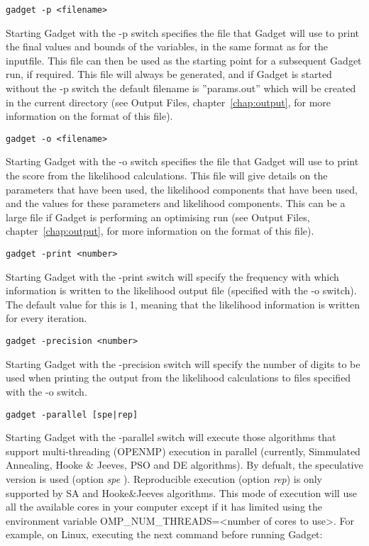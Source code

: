 \documentclass[10pt,twoside]{book}
\begin{document}
\newpage %
{\small\begin{verbatim}
gadget -p <filename>
\end{verbatim}}
Starting Gadget with the -p switch specifies the file that Gadget will use to print the final values and bounds of the variables, in the same format as for the inputfile.  This file can then be used as the starting point for a subsequent Gadget run, if required.  This file will always be generated, and if Gadget is started without the -p switch the default filename is ''params.out'' which will be created in the current directory (see Output Files, chapter~\ref{chap:output}, for more information on the format of this file).

{\small\begin{verbatim}
gadget -o <filename>
\end{verbatim}}
Starting Gadget with the -o switch specifies the file that Gadget will use to print the score from the likelihood calculations.  This file will give details on the parameters that have been used, the likelihood components that have been used, and the values for these parameters and likelihood components.  This can be a large file if Gadget is performing an optimising run (see Output Files, chapter~\ref{chap:output}, for more information on the format of this file).

{\small\begin{verbatim}
gadget -print <number>
\end{verbatim}}
Starting Gadget with the -print switch will specify the frequency with which information is written to the likelihood output file (specified with the -o switch).  The default value for this is 1, meaning that the likelihood information is written for every iteration.

{\small\begin{verbatim}
gadget -precision <number>
\end{verbatim}}
Starting Gadget with the -precision switch will specify the number of digits to be used when printing the output from the likelihood calculations to files specified with the -o switch.

{\small\begin{verbatim}
gadget -parallel [spe|rep]
\end{verbatim}}
Starting Gadget with the -parallel switch will execute those algorithms that support multi-threading (OPENMP) execution in parallel (currently, Simmulated Annealing, Hooke \& Jeeves, PSO and DE algorithms). By defualt, the speculative version is used (option {\it spe }). Reproducible execution (option {\it rep}) is only supported by SA and Hooke\&Jeeves algorithms. This mode of execution will use all the available cores in your computer except if it has limited using the environment variable OMP\_NUM\_THREADS=<number of cores to use>. For example, on Linux, executing the next command before running Gadget:
\end{document}
